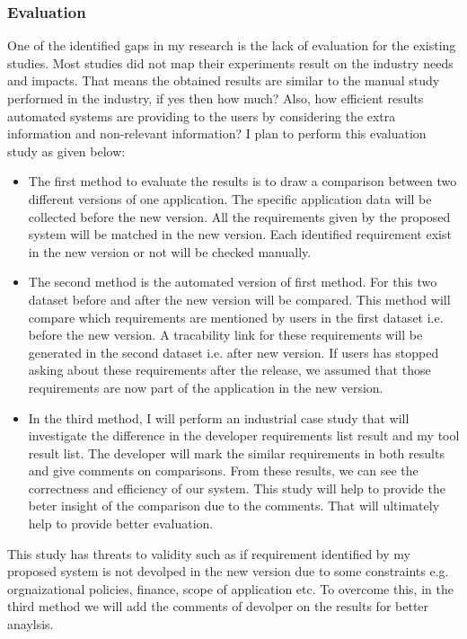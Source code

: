 \subsubsection {Evaluation\\}
One of the identified gaps in my research is the lack of evaluation for the existing studies. Most studies did not map their experiments result on the industry needs and impacts. That means the obtained results are similar to the manual study performed in the industry, if yes then how much? Also, how efficient results automated systems are providing to the users by considering the extra information and non-relevant information? I plan to perform this evaluation study as given below: \\
\begin {itemize}
\item{The first method to evaluate the results is to draw a comparison between two different versions of one application. The specific application data will be collected before the new version. All the requirements given by the proposed system will be matched in the new version. Each identified requirement exist in the new version or not will be checked manually.\\}
\item{The second method is the automated version of first method. For this two dataset before and after the new version will be compared. This method will compare which requirements  are mentioned by users in the first dataset i.e. before the new version. A tracability link for these requirements will be generated in the second dataset i.e. after new version. If users has stopped asking about these requirements after the release, we assumed that those requirements are now part of the application in the new version.\\}
\item{In the third method, I will perform an industrial case study that will investigate the difference in the developer requirements list result and my tool result list. The developer will mark the similar requirements in both results and give comments on  comparisons. From these results, we can see the correctness and efficiency of our system. This study will help to provide the beter insight of the comparison due to the comments. That will ultimately help to provide better evaluation.\\}
\end{itemize}
This study has threats to validity such as if requirement identified by my proposed system is not devolped in the new version due to some constraints e.g. orgnaizational policies, finance, scope of application etc. To overcome this, in the third method we will add the comments of devolper on the results for better anaylsis.